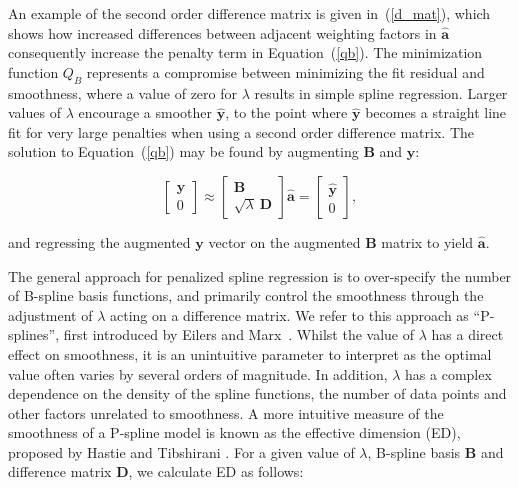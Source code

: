 \documentclass[num-refs]{wiley-article}
\begin{document}
An example of the second order difference matrix is given in~(\ref{d_mat}), which shows how increased differences between adjacent weighting factors in $\hat{\mathbf{a}}$ consequently increase the penalty term in Equation~(\ref{qb}). The minimization function $Q_{B}$ represents a compromise between minimizing the fit residual and smoothness, where a value of zero for $\lambda$ results in simple spline regression. Larger values of $\lambda$ encourage a smoother $\hat{\mathbf{y}}$, to the point where $\hat{\mathbf{y}}$ becomes a straight line fit for very large penalties when using a second order difference matrix. The solution to Equation~(\ref{qb}) may be found by augmenting $\mathbf{B}$ and $\mathbf{y}$:

\begin{equation}
  \begin{bmatrix}
    \mathbf{y} \\ 0
  \end{bmatrix}
  \approx
  \begin{bmatrix}
    \mathbf{B} \\ \sqrt{\lambda} \ \mathbf{D}
  \end{bmatrix} \hat{\mathbf{a}} =
  \begin{bmatrix}
    \hat{\mathbf{y}} \\ 0
  \end{bmatrix},
  \label{p-spline_eq}
\end{equation}

and regressing the augmented $\mathbf{y}$ vector on the augmented $\mathbf{B}$ matrix to yield $\hat{\mathbf{a}}$.

The general approach for penalized spline regression is to over-specify the number of B-spline basis functions, and primarily control the smoothness through the adjustment of $\lambda$ acting on a difference matrix. We refer to this approach as ``P-splines'', first introduced by Eilers and Marx~\cite{Eilers1996}. Whilst the value of $\lambda$ has a direct effect on smoothness, it is an unintuitive parameter to interpret as the optimal value often varies by several orders of magnitude. In addition, $\lambda$ has a complex dependence on the density of the spline functions, the number of data points and other factors unrelated to smoothness. A more intuitive measure of the smoothness of a P-spline model is known as the effective dimension (ED), proposed by Hastie and Tibshirani \cite{Hastie1990}. For a given value of $\lambda$, B-spline basis $\mathbf{B}$ and difference matrix $\mathbf{D}$, we calculate ED as follows:
\end{document}

